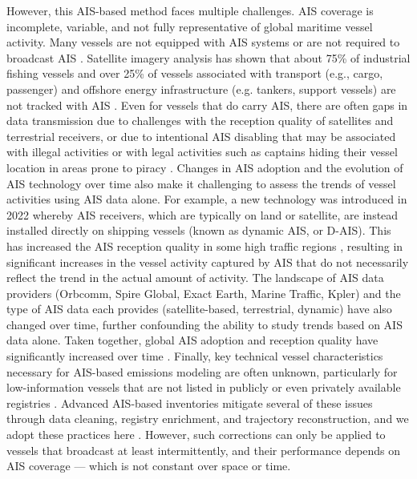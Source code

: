 \documentclass[lineno,pdflatex,sn-nature]{sn-jnl}
\begin{document}
However, this AIS-based method faces multiple challenges. AIS coverage is incomplete, variable, and not fully representative of global maritime vessel activity. Many vessels are not equipped with AIS systems or are not required to broadcast AIS \cite{taconet2019global}. Satellite imagery analysis has shown that about 75\% of industrial fishing vessels and over 25\% of vessels associated with transport (e.g., cargo, passenger) and offshore energy infrastructure (e.g. tankers, support vessels) are not tracked with AIS \cite{paolo2024satellite}. Even for vessels that do carry AIS, there are often gaps in data transmission due to challenges with the reception quality of satellites and terrestrial receivers, or due to intentional AIS disabling that may be associated with illegal activities or with legal activities such as captains hiding their vessel location in areas prone to piracy \cite{welch2022hot}. Changes in AIS adoption and the evolution of AIS technology over time also make it challenging to assess the trends of vessel activities using AIS data alone. For example, a new technology was introduced in 2022 whereby AIS receivers, which are typically on land or satellite, are instead installed directly on shipping vessels (known as dynamic AIS, or D-AIS). This has increased the AIS reception quality in some high traffic regions \cite{spire_documentation_2022}, resulting in significant increases in the vessel activity captured by AIS that do not necessarily reflect the trend in the actual amount of activity. The landscape of AIS data providers (Orbcomm, Spire Global, Exact Earth, Marine Traffic, Kpler) and the type of AIS data each provides (satellite-based, terrestrial, dynamic) have also changed over time, further confounding the ability to study trends based on AIS data alone. Taken together, global AIS adoption and reception quality have significantly increased over time \cite{kroodsma2025tenfold}. Finally, key technical vessel characteristics necessary for AIS-based emissions modeling are often unknown, particularly for low-information vessels that are not listed in publicly or even privately available registries \cite{chen2024analysis}. Advanced AIS-based inventories mitigate several of these issues through data cleaning, registry enrichment, and trajectory reconstruction, and we adopt these practices here \cite{kroodsma2018tracking, park2023tracking}. However, such corrections can only be applied to vessels that broadcast at least intermittently, and their performance depends on AIS coverage — which is not constant over space or time.
\end{document}
